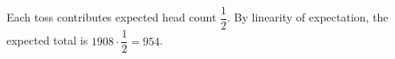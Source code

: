 Each toss contributes expected head count $\dfrac{1}{2}$. By linearity of expectation, the expected total is $1908\cdot\dfrac{1}{2}=\boxed{954}$.
